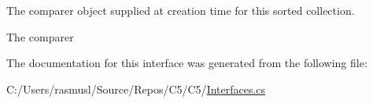 The comparer object supplied at creation time for this sorted collection. 

The comparer

The documentation for this interface was generated from the following file\+:\begin{DoxyCompactItemize}
\item 
C\+:/\+Users/rasmusl/\+Source/\+Repos/\+C5/\+C5/\hyperlink{_interfaces_8cs}{Interfaces.\+cs}\end{DoxyCompactItemize}
